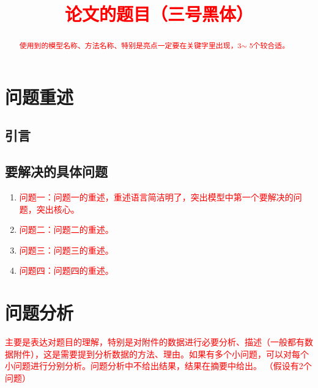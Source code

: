 \documentclass[a4paper]{nmmcm}
\title{\textcolor{red}{论文的题目（三号黑体）}}
\date{}
\begin{document}
\begin{abstract}


\begin{keywords}
{\song\xiaosihao
\textcolor{red}{使用到的模型名称、方法名称、特别是亮点一定要在关键字里出现，3$\sim$ 5个较合适。}}
\end{keywords}

\end{abstract}
\maketitle 

\newpage
\setcounter{page}{1}
\pagestyle{fancy}

\section{问题重述}
\subsection{引言}


\subsection{要解决的具体问题}
\begin{enumerate}
  \item \textcolor{red}{问题一：问题一的重述，重述语言简洁明了，突出模型中第一个要解决的问题，突出核心。}
  \item \textcolor{red}{问题二：问题二的重述。}
  \item \textcolor{red}{问题三：问题三的重述。}
  \item \textcolor{red}{问题四：问题四的重述。}
\end{enumerate}







\section{问题分析}

\textcolor{red}{主要是表达对题目的理解，特别是对附件的数据进行必要分析、描述（一般都有数据附件），这是需要提到分析数据的方法、理由。如果有多个小问题，可以对每个小问题进行分别分析。问题分析中不给出结果，结果在摘要中给出。
（假设有2个问题）}
\end{document}
